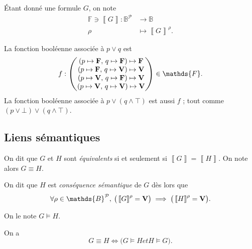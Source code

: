\begin{defn}
	Étant donné une formule $G$, on note
	\begin{align*}
		\mathds{F} \ni \left\llbracket G \right\rrbracket : \mathds{B}^{\mathcal{P}} &\longrightarrow \mathds{B}  \\
		\rho &\longmapsto \left\llbracket G \right\rrbracket^{\rho}.
	\end{align*}
\end{defn}

\begin{exm}
	La fonction booléenne associée à $p \lor q$\/ est \[
		f : \begin{pmatrix}
			(p\mapsto {\bfm F},\,q \mapsto {\bfm F}\/)\mapsto {\bfm F}\/\\
			(p\mapsto {\bfm F},\,q \mapsto {\bfm V}\/)\mapsto {\bfm V}\/\\
			(p\mapsto {\bfm V},\,q \mapsto {\bfm F}\/)\mapsto {\bfm V}\/\\
			(p\mapsto {\bfm V},\,q \mapsto {\bfm V}\/)\mapsto {\bfm V}\/\\
		\end{pmatrix} \in \mathds{F}.
	\]
	La fonction booléenne associée à $p \lor (q \land \top)$\/ est aussi $f$ ; tout comme $(p \lor \bot) \lor (q \land \top)$.
\end{exm}

\subsection{Liens sémantiques}

\begin{defn}
	On dit que $G$\/ et $H$\/ sont {\it équivalents}\/ si et seulement si $\left\llbracket G \right\rrbracket = \left\llbracket H \right\rrbracket$.
	On note alors $G \equiv H$.
\end{defn}

\begin{defn}
	On dit que $H$\/ est {\it conséquence sémantique}\/ de $G$\/ dès lors que \[
		\forall \rho \in \mathds{B}^{\mathcal{P}},\:\big(\left\llbracket G \right\rrbracket^{\rho} = {\bfm V}\/ \big) \implies \big(\left\llbracket H \right\rrbracket^\rho = {\bfm V}\/ \big)
	.\]

	On le note $G \models H$.
\end{defn}

\begin{prop}
	On a \[
		G \equiv H \iff \big(G \models H \mathrel{et} H \models G\big)
	.\]
\end{prop}

